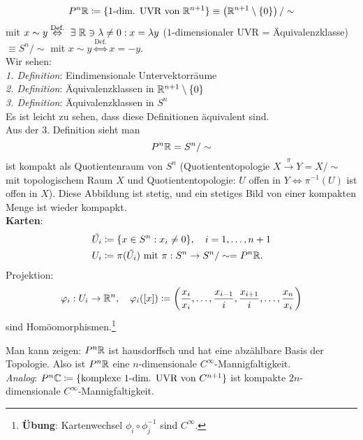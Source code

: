 \begin{example}
\begin{enumerate}
\begin{equation*}
        P^n\mathbb{R} \coloneqq \{ \text{1-dim. UVR von } \mathbb{R}^{n+1} \} \equiv \left( \mathbb{R}^{n+1} \setminus \{ 0 \} \right) /\sim
      \end{equation*}
      mit $ x \sim y \overset{\text{Def.}}{\Leftrightarrow} \ \exists \ \mathbb{R} \ni \lambda \neq 0 : x = \lambda y $ ($ 1 $-dimensionaler UVR = Äquivalenzklasse) $ \equiv S^n/\sim $ mit $ x \sim y \overset{\text{Def.}}{\Leftrightarrow} x = -y $. \\
      Wir sehen: \\
      \emph{1. Definition}: Eindimensionale Untervektorräume \\
      \emph{2. Definition}: Äquivalenzklassen in $ \mathbb{R}^{n+1} \setminus \{ 0 \} $ \\
      \emph{3. Definition}: Äquivalenzklassen in $ S^n $ \\
      Es ist leicht zu sehen, dass diese Definitionen äquivalent sind. \\
      Aus der 3. Definition sieht man
      \begin{equation*}
        P^n\mathbb{R} = S^n/\sim
      \end{equation*}
      ist kompakt als Quotientenraum von $ S^n $ (Quotiententopologie $ X \overset{\pi}{\to} Y = X/\sim $ mit topologischem Raum $ X $ und Quotiententopologie: $ U $ offen in $ Y \Leftrightarrow \pi^{-1}(U) $ ist offen in $ X $). Diese Abbildung ist stetig, und ein stetiges Bild von einer kompakten Menge ist wieder kompapkt. \\
      \textbf{Karten}:
      \begin{align*}
        \tilde{U_i} &\coloneqq \{ x \in S^n : x_i \neq 0 \}, \quad i = 1, \dots, n+1 \\
        U_i &\coloneqq \pi(\tilde{U_i}) \text{ mit } \pi: S^n \to S^n/\sim = P^n\mathbb{R}\text{.}
      \end{align*}
      Projektion:
      \begin{equation*}
        \varphi_i : U_i \to \mathbb{R}^n, \quad \varphi_i([x]) \coloneqq \left( \frac{x_i}{x_i}, \dots, \frac{x_{i-1}}{i}, \frac{x_{i+1}}{i}, \dots, \frac{x_n}{x_i} \right)
      \end{equation*}
      sind Homöomorphismen.\footnote{\textbf{Übung}: Kartenwechsel $ \phi_i \circ \phi_j^{-1} $ sind $ C^\infty $.}
  \end{enumerate}
\end{example}

\begin{remark}
  Man kann zeigen: $ P^n\mathbb{R} $ ist hausdorffsch und hat eine abzählbare Basis der Topologie. Also ist $ P^n\mathbb{R} $ eine $ n $-dimensionale $ C^\infty $-Mannigfaltigkeit. \\
  \emph{Analog}: $ P^n\mathbb{C} \coloneqq \{ \text{komplexe $ 1 $-dim. UVR von } C^{n+1} \} $ ist kompakte $ 2n $-dimensionale $ C^\infty $-Mannigfaltigkeit.
\end{remark}

